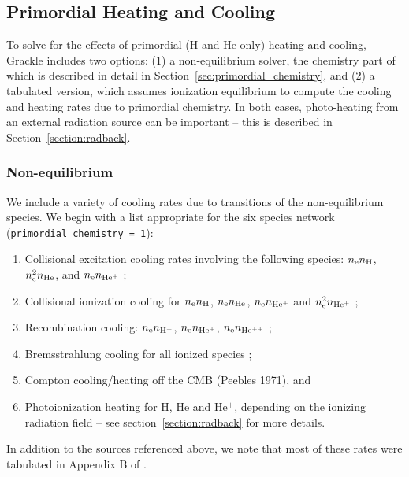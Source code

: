 
\subsection{Primordial Heating and Cooling}

To solve for the effects of primordial (H and He only) heating and cooling, Grackle includes two options: (1) a non-equilibrium solver, the chemistry part of which is described in detail in Section~\ref{sec:primordial_chemistry}, and (2) a tabulated version, which assumes ionization equilibrium to compute the cooling and heating rates due to primordial chemistry.  In both cases, photo-heating from an external radiation source can be important -- this is described in Section~\ref{section:radback}.

\subsubsection{Non-equilibrium} \label{sec:pri-neq}

We include a variety of cooling rates due to transitions of the non-equilibrium species.  We begin with a list appropriate for the six species network (\texttt{primordial\_chemistry = 1}): 

\begin{enumerate}
\item Collisional excitation cooling rates involving the following species: $n_{\rm e} n_{\rm H}$, $n_{\rm e}^2 n_{\rm He}$, and $n_{\rm e} n_{\rm He^+}$ \citep{1981MNRAS.197..553B, 1992ApJS...78..341C};
\item Collisional ionization cooling for $n_{\rm e} n_{\rm H}$, $n_{\rm e} n_{\rm He}$, $n_{\rm e} n_{\rm He^+}$ and $n_{\rm e}^2 n_{\rm He^+}$ \citep{1987ApJ...318...32S, 1992ApJS...78..341C, 1997NewA....2..181A};
\item Recombination cooling: $n_{\rm e} n_{\rm H^+}$, $n_{\rm e} n_{\rm He^+}$, $n_{\rm e} n_{\rm He^{++}}$ \citep{1981MNRAS.197..553B, 1978ppim.book.....S};
\item Bremsstrahlung cooling for all ionized species \citep{1981MNRAS.197..553B};
\item Compton cooling/heating off the CMB (Peebles 1971), and 
\item Photoionization heating for H, He and He$^+$, depending on the ionizing radiation field -- see section~\ref{section:radback} for more details.
\end{enumerate}
In addition to the sources referenced above, we note that most of these rates were tabulated in Appendix B of \citet{1997NewA....2..209A}.

